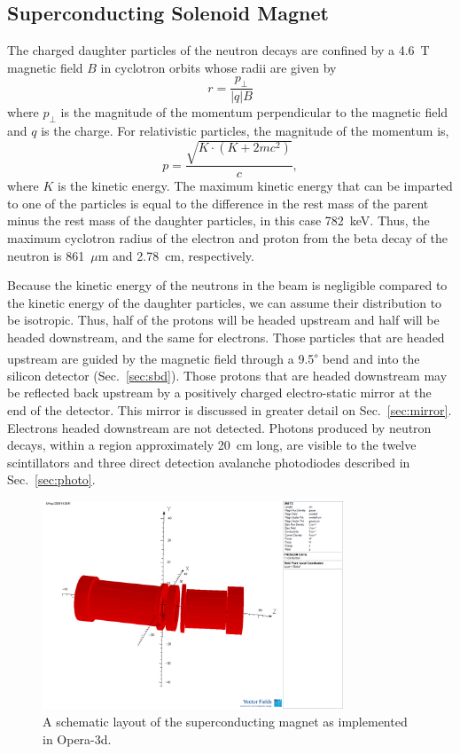 \documentclass[oneside,12pt]{memoir}
\begin{document}
\subsection{Superconducting Solenoid Magnet}
The charged daughter particles of the neutron decays are confined by a 4.6~T magnetic field $B$ in cyclotron orbits whose radii are given by
\begin{equation}
	\label{eq:cyclotron}
	r=\frac{p_\perp}{|q|B}
\end{equation}
where $p_\perp$ is the magnitude of the momentum perpendicular to the magnetic field and $q$ is the charge. For relativistic particles, the magnitude of the momentum is,
\begin{equation}
	\label{eq:relmom}
	p=\frac{\sqrt{K\cdot(K+2mc^2)}}{c},
\end{equation}
where $K$ is the kinetic energy. The maximum kinetic energy that can be imparted to one of the particles is equal to the difference in the rest mass of the parent minus the rest mass of the daughter particles, in this case 782~keV. Thus, the maximum cyclotron radius of the electron and proton from the beta decay of the neutron is 861~$\mu$m and 2.78~cm, respectively.\par
Because the kinetic energy of the neutrons in the beam is negligible compared to the kinetic energy of the daughter particles, we can assume their distribution to be isotropic. Thus, half of the protons will be headed upstream and half will be headed downstream, and the same for electrons. Those particles that are headed upstream are guided by the magnetic field through a 9.5\textsuperscript{$\circ$} bend and into the silicon detector (Sec.~\ref{sec:sbd}). Those protons that are headed downstream may be reflected back upstream by a positively charged electro-static mirror at the end of the detector. This mirror is discussed in greater detail on Sec.~\ref{sec:mirror}. Electrons headed downstream are not detected. Photons produced by neutron decays, within a region approximately 20~cm long, are visible to the twelve scintillators and three direct detection avalanche photodiodes described in Sec.~\ref{sec:photo}.\par
\label{sec:magnet}
\begin{figure}[t]
	\centering
	\includegraphics[width=0.8\textwidth]{Magnet1.png}
	\caption[A schematic layout of the superconducting magnet]{A schematic layout of the superconducting magnet as implemented in Opera-3d.}
	\label{fig:magnet}
\end{figure}
\end{document}
